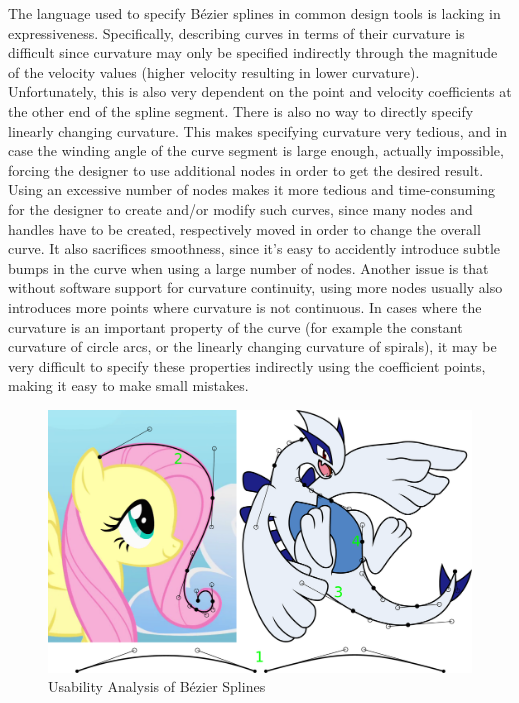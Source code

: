 \documentclass[a4paper]{article}
\begin{document}
				The language used to specify Bézier splines in common design tools is lacking in expressiveness. Specifically, describing curves in terms of their curvature is difficult since curvature may only be specified indirectly through the magnitude of the velocity values (higher velocity resulting in lower curvature). Unfortunately, this is also very dependent on the point and velocity coefficients at the other end of the spline segment. There is also no way to directly specify linearly changing curvature. This makes specifying curvature very tedious, and in case the winding angle of the curve segment is large enough, actually impossible, forcing the designer to use additional nodes in order to get the desired result. Using an excessive number of nodes makes it more tedious and time-consuming for the designer to create and/or modify such curves, since many nodes and handles have to be created, respectively moved in order to change the overall curve. It also sacrifices smoothness, since it's easy to accidently introduce subtle bumps in the curve when using a large number of nodes. Another issue is that without software support for curvature continuity, using more nodes usually also introduces more points where curvature is not continuous. In cases where the curvature is an important property of the curve (for example the constant curvature of circle arcs, or the linearly changing curvature of spirals), it may be very difficult to specify these properties indirectly using the coefficient points, making it easy to make small mistakes.

				\begin{figure}[htb]
					\centering
					\includegraphics[width=\textwidth]{../resources/usability_bezier.pdf}
					\caption{Usability Analysis of Bézier Splines}
					\label{figure:usability_bézier}
				\end{figure}
\end{document}
